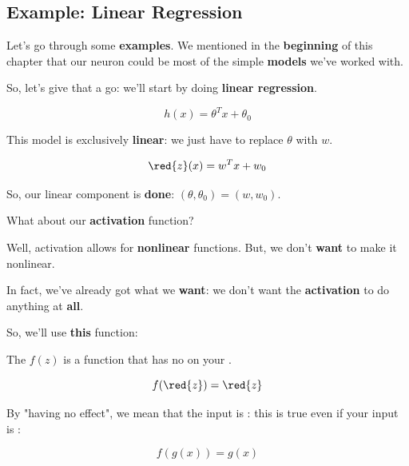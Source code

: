     \subsection*{Example: Linear Regression}
    
        Let's go through some \textbf{examples}. We mentioned in the \textbf{beginning} of this chapter that our neuron could be most of the simple \textbf{models} we've worked with.
        
        So, let's give that a go: we'll start by doing \textbf{linear regression}.
        
        \begin{equation*}
            h(x) = \theta^T x + \theta_0
        \end{equation*}
        
        This model is exclusively \textbf{linear}: we just have to replace $\theta$ with $w$.
        
        \begin{equation*}
            \red{z}(x) = w^T x + w_0
        \end{equation*}
        
        So, our linear component is \textbf{done}: $(\theta, \theta_0) = (w, w_0)$.
        
        What about our \textbf{activation} function?
        
        Well, activation allows for \textbf{nonlinear} functions. But, we don't \textbf{want} to make it nonlinear. 
        
        In fact, we've already got what we \textbf{want}: we don't want the \textbf{activation} to do anything at \textbf{all}.
        
        So, we'll use \textbf{this} function:\\
        
        \begin{concept}
            The  $f(z)$ is a function that has no  on your .
            
            \begin{equation*}
                f(\red{z}) = \red{z}
            \end{equation*}
            
            By "having no effect", we mean that the input is : this is true even if your input is :
            
            \begin{equation}
                f(g(x)) = g(x)
            \end{equation}
        \end{concept}
        
